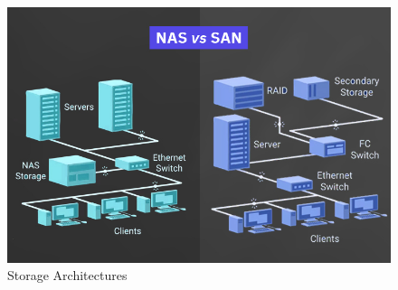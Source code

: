 \documentclass{article}
\begin{document}
\begin{figure}
    \centering
    \includegraphics[scale=0.3]{nassan.jpg}
    \caption{Storage Architectures}
    \label{fig:my_label_0}
\end{figure}
\end{document}
